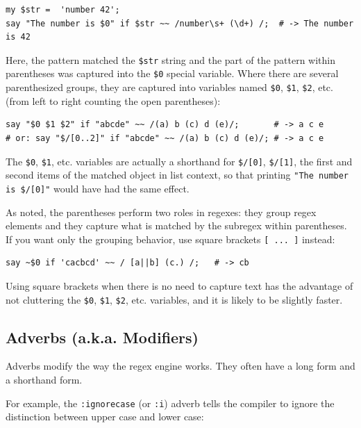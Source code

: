\begin{verbatim}
my $str =  'number 42';
say "The number is $0" if $str ~~ /number\s+ (\d+) /;  # -> The number is 42
\end{verbatim}
%

Here, the pattern matched the \verb'$str' string and the 
part of the pattern within parentheses was captured into 
the \verb'$0' special variable. Where there are several 
parenthesized groups, they are captured into variables 
named \verb'$0', \verb'$1',  \verb'$2', etc. (from 
left to right counting the open parentheses):

\begin{verbatim}
say "$0 $1 $2" if "abcde" ~~ /(a) b (c) d (e)/;       # -> a c e
# or: say "$/[0..2]" if "abcde" ~~ /(a) b (c) d (e)/; # -> a c e
\end{verbatim}
%

The \verb'$0', \verb'$1', etc. variables are actually a 
shorthand for \verb'$/[0]', \verb'$/[1]', the first and 
second items of the matched 
object in list context, so that printing  
\verb'"The number is $/[0]"' would have had the same 
effect. 

As noted, the parentheses perform two roles in regexes: 
they group regex elements and they capture what is matched 
by the subregex within parentheses. If you want only the 
grouping behavior, use square brackets
\verb'[ ... ]' instead:

\begin{verbatim}
say ~$0 if 'cacbcd' ~~ / [a||b] (c.) /;   # -> cb
\end{verbatim}
%

Using square brackets when there is no need to capture 
text has the advantage of not cluttering the \verb'$0', 
\verb'$1', \verb'$2', etc. variables, and it is likely 
to be slightly faster.

\subsection{Adverbs (a.k.a. Modifiers)}
\label{adverb}

Adverbs modify the way the regex engine works. They often have a 
long form and a shorthand form.

For example, the \verb':ignorecase' (or \verb':i') adverb 
tells the compiler to ignore the distinction between upper 
case and lower case: 

